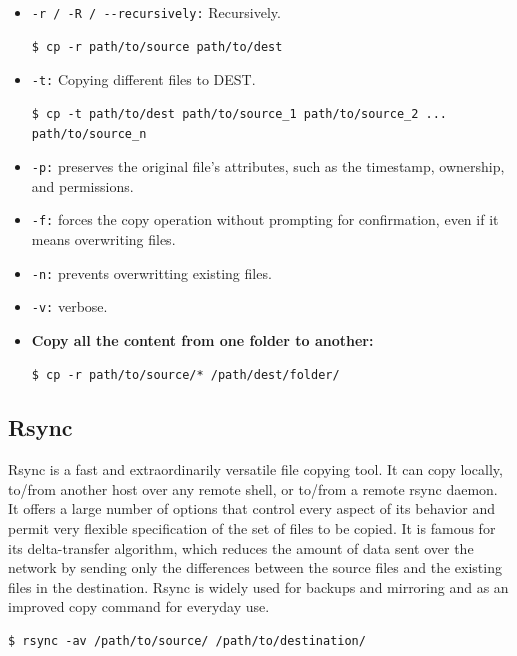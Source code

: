 \documentclass{article}
\newenvironment{codetemplate}[1][]{%
  \mybasecolorbox[#1]
  \itshape
}{%
  \endmybasecolorbox
}
\begin{document}
\begin{itemize}
    \item \verb|-r / -R / --recursively:| Recursively.
\begin{codetemplate}{}
\begin{verbatim}
$ cp -r path/to/source path/to/dest
\end{verbatim}
\end{codetemplate}

    \item \verb|-t:| Copying different files to DEST.
\begin{codetemplate}{}
\begin{verbatim}
$ cp -t path/to/dest path/to/source_1 path/to/source_2 ... path/to/source_n
\end{verbatim}
\end{codetemplate}

    \item \verb|-p:| preserves the original file's attributes, such as the timestamp, ownership, and permissions.
    \item \verb|-f:| forces the copy operation without prompting for confirmation, even if it means overwriting files.
    \item \verb|-n:| prevents overwritting existing files.
    \item \verb|-v:| verbose.
    \item \textbf{Copy all the content from one folder to another:}
\begin{codetemplate}{}
\begin{verbatim}
$ cp -r path/to/source/* /path/dest/folder/
\end{verbatim}
\end{codetemplate}
\end{itemize}

\subsection{Rsync}
Rsync is a fast and extraordinarily versatile file copying tool.  It can copy locally,  to/from  another  host over any remote shell, or to/from a remote rsync daemon.  
It offers a large number of options that control every aspect of its behavior and permit very flexible specification of the set of files to be copied.  
It is famous  for its delta-transfer algorithm, which reduces the amount of data sent over the network by sending only the differences between the source files and the existing files in the destination.  
Rsync is widely used  for backups and mirroring and as an improved copy command for everyday use.
\begin{codetemplate}{}
\begin{verbatim}
$ rsync -av /path/to/source/ /path/to/destination/
\end{verbatim}
\end{codetemplate}
\end{document}
